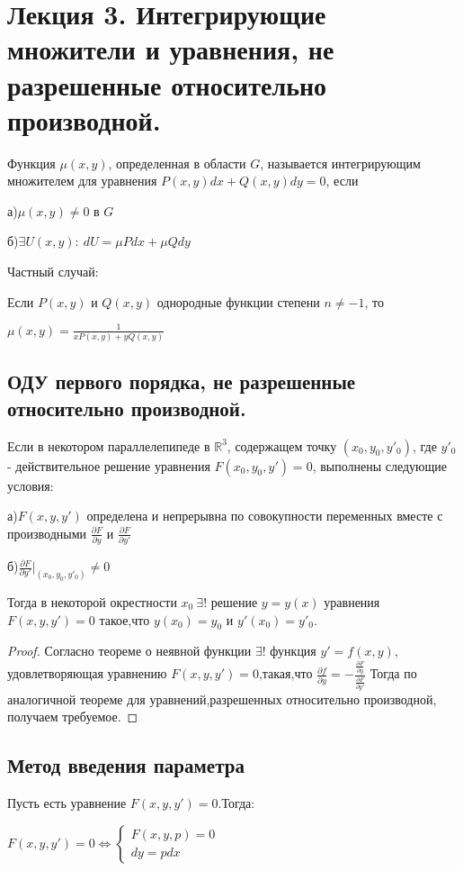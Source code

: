 \documentclass[document.tex]{subfiles}
\begin{document}
\section*{Лекция 3. Интегрирующие множители и уравнения, не разрешенные относительно производной.}
\begin{definition}
Функция $\mu(x,y)$, определенная в области $G$, называется интегрирующим множителем для уравнения $P(x,y)dx+Q(x,y)dy=0$, если 

а)$\mu(x,y)\neq0$ в $G$

б)$ \exists U(x,y): \ dU=\mu Pdx+\mu Qdy$
\end{definition}
Частный случай:

Если $P(x,y)$ и $Q(x,y)$ однородные функции степени $n\neq -1$, то 

$\mu(x,y)=\frac{1}{xP(x,y)+yQ(x,y)}$
\subsection*{ОДУ первого порядка, не разрешенные относительно производной.}
\begin{theorem}
Если в некотором параллелепипеде в $\mathbb{R}^3$, содержащем точку $(x_0,y_0,y'_0)$, где $y'_0$ - действительное решение уравнения $F(x_0,y_0,y')=0$, выполнены  следующие условия:

а)$F(x,y,y')$ определена и непрерывна по совокупности переменных  вместе с производными $\frac{\partial F}{\partial y}$ и $\frac{\partial F}{\partial y'}$

б)$\frac{\partial F}{\partial y'}|_{(x_0,y_0,y'_0)} \neq0$

Тогда в некоторой окрестности $x_0\ \exists!$ решение $y=y(x)$ уравнения $F(x,y,y')=0$ такое,что $y(x_0)=y_0$ и $y'(x_0)=y'_0$.
\end{theorem}
\begin{proof}

Согласно теореме о неявной функции $\exists!$ 
функция $y'=f(x,y)$, удовлетворяющая уравнению $F(x,y,y')=0$,такая,что 
$\frac{\partial f}{\partial y} = - \frac{\frac{\partial F}{\partial y}}{\frac{\partial F}{\partial y'}}$
Тогда по аналогичной теореме для уравнений,разрешенных относительно производной, получаем требуемое.
\end{proof}
\subsection*{Метод введения параметра}
Пусть есть уравнение $F(x,y,y')=0$.Тогда:

$F(x,y,y')=0 \Leftrightarrow \left\{\begin{aligned} F(x,y,p)=0\\dy=pdx \end{aligned}\right.$
\end{document}
